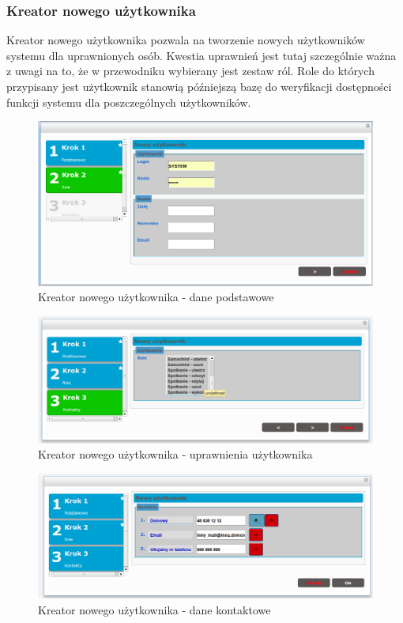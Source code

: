 	\subsubsection{Kreator nowego użytkownika}
		Kreator nowego użytkownika pozwala na tworzenie nowych użytkowników systemu dla uprawnionych osób. 
		Kwestia uprawnień jest tutaj szczególnie ważna z uwagi na to, że w przewodniku wybierany jest zestaw ról.
		Role do których przypisany jest użytkownik stanowią późniejszą bazę do weryfikacji dostępności funkcji systemu
		dla poszczególnych użytkowników. 
		\begin{figure}[H]
			\centering
			\includegraphics[width=1.0\textwidth]{images/newUser-basic}
			\caption[Kreator nowego użytkownika - dane podstawowe]{
				Kreator nowego użytkownika - dane podstawowe	
			}
			\label{app:newUser_basic}
		\end{figure}	
		\begin{figure}[h]
			\centering
			\includegraphics[width=1.0\textwidth]{images/newUser-roles}
			\caption[Kreator nowego użytkownika - uprawnienia użytkownika]{
				Kreator nowego użytkownika - uprawnienia użytkownika
			}
			\label{app:newUser_roles}
		\end{figure}	
		\begin{figure}[H]
			\centering
			\includegraphics[width=1.0\textwidth]{images/newUser-contacts}
			\caption[Kreator nowego użytkownika - dane kontaktowe]{
				Kreator nowego użytkownika - dane kontaktowe
			}
			\label{app:newUser_contacts}
		\end{figure}	
		
